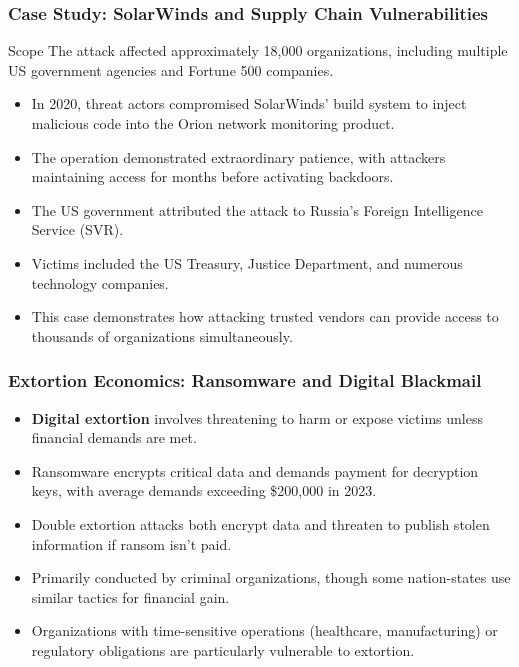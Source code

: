 \documentclass{beamer}
\begin{document}
\begin{frame}
    \frametitle{Case Study: SolarWinds and Supply Chain Vulnerabilities}
    
    \begin{alertblock}{Scope}
        The attack affected approximately 18,000 organizations, including multiple US government agencies and Fortune 500 companies.
    \end{alertblock}
    
    \begin{itemize}
        \item In 2020, threat actors compromised SolarWinds' build system to inject malicious code into the Orion network monitoring product.
        \item The operation demonstrated extraordinary patience, with attackers maintaining access for months before activating backdoors.
        \item The US government attributed the attack to Russia's Foreign Intelligence Service (SVR).
        \item Victims included the US Treasury, Justice Department, and numerous technology companies.
        \item This case demonstrates how attacking trusted vendors can provide access to thousands of organizations simultaneously.
    \end{itemize}
\end{frame}

\begin{frame}
    \frametitle{Extortion Economics: Ransomware and Digital Blackmail}
    
    \begin{itemize}
        \item \textbf{Digital extortion} involves threatening to harm or expose victims unless financial demands are met.
        \item Ransomware encrypts critical data and demands payment for decryption keys, with average demands exceeding \$200,000 in 2023.
        \item Double extortion attacks both encrypt data and threaten to publish stolen information if ransom isn't paid.
        \item Primarily conducted by criminal organizations, though some nation-states use similar tactics for financial gain.
        \item Organizations with time-sensitive operations (healthcare, manufacturing) or regulatory obligations are particularly vulnerable to extortion.
    \end{itemize}
\end{frame}
\end{document}
